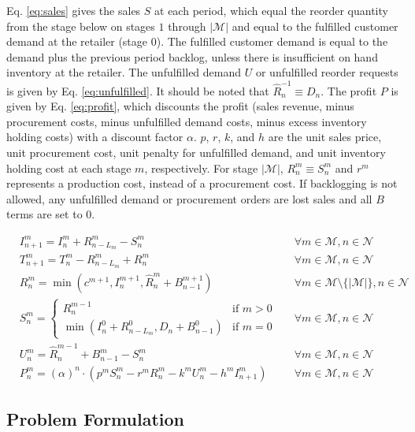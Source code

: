 \documentclass[12pt]{article}
\begin{document}
Eq. \ref{eq:sales} gives the sales $S$ at each period, which equal the reorder quantity from the stage below on stages $1$ through $|\mathcal{M}|$ and equal to the fulfilled customer demand at the retailer (stage $0$). The fulfilled customer demand is equal to the demand plus the previous period backlog, unless there is insufficient on hand inventory at the retailer. The unfulfilled demand $U$ or unfulfilled reorder requests is given by Eq. \ref{eq:unfulfilled}. It should be noted that $\hat{R}^{-1}_n \equiv D_n$. The profit $P$ is given by Eq. \ref{eq:profit}, which discounts the profit (sales revenue, minus procurement costs, minus unfulfilled demand costs, minus excess inventory holding costs) with a discount factor $\alpha$. $p$, $r$, $k$, and $h$ are the unit sales price, unit procurement cost, unit penalty for unfulfilled demand, and unit inventory holding cost at each stage $m$, respectively. For stage $|\mathcal{M}|$, $R^m_n \equiv S^m_n$ and $r^m$ represents a production cost, instead of a procurement cost. If backlogging is not allowed, any unfulfilled demand or procurement orders are lost sales and all $B$ terms are set to 0.

\begin{align}
    & I^m_{n+1} = I^m_n + R^m_{n-L_m} - S^m_n && \forall m \in \mathcal{M}, n \in \mathcal{N} \label{eq:invbal} \\
    & T^m_{n+1} = T^m_n - R^m_{n-L_m} + R^m_n && \forall m \in \mathcal{M}, n \in \mathcal{N} \label{eq:pipebal} \\
    & R^m_n = \min\left(c^{m+1},I^{m+1}_n,\hat{R}^m_n + B^{m+1}_{n-1}\right) && \forall m \in \mathcal{M} \setminus \{|\mathcal{M}|\}, n \in \mathcal{N} \label{eq:reorder} \\
    & S^m_n = 
    \begin{cases}
        R^{m-1}_n & \text{if $m>0$}\\
        \min\left(I^0_n + R^0_{n-L_m},D_n + B^0_{n-1}\right) & \text{if $m=0$}
    \end{cases}
    && \forall m \in \mathcal{M}, n \in \mathcal{N} \label{eq:sales} \\
    & U^m_n = \hat{R}^{m-1}_n + B^m_{n-1} - S^m_n && \forall m \in \mathcal{M}, n \in \mathcal{N} \label{eq:unfulfilled} \\
    & P^m_n = (\alpha)^n \cdot \left(p^m S^m_n -  r^m R^m_n - k^m U^m_n - h^m I^m_{n+1}\right) && \forall m \in \mathcal{M}, n \in \mathcal{N} \label{eq:profit}
\end{align}

\subsection{Problem Formulation}
\end{document}
